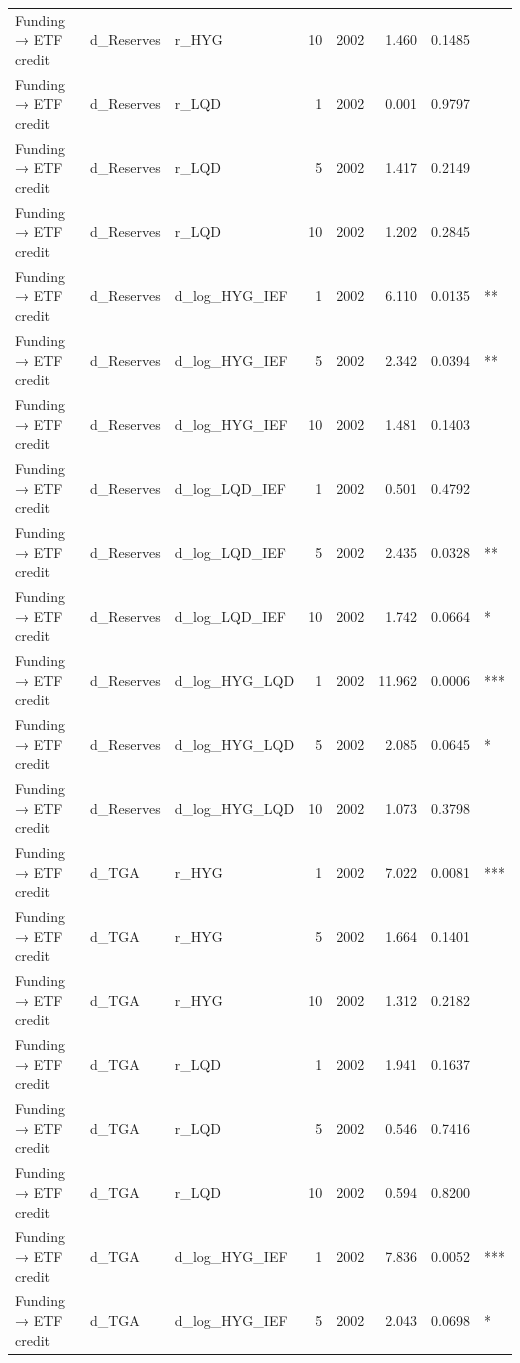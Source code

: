 \begin{table}[htbp]
\begin{tabular}{lllrrrrl}
  Funding → ETF credit & d\_Reserves & r\_HYG & 10 & 2002 & 1.460 & 0.1485 &     \\ 
  Funding → ETF credit & d\_Reserves & r\_LQD & 1 & 2002 & 0.001 & 0.9797 &     \\ 
  Funding → ETF credit & d\_Reserves & r\_LQD & 5 & 2002 & 1.417 & 0.2149 &     \\ 
  Funding → ETF credit & d\_Reserves & r\_LQD & 10 & 2002 & 1.202 & 0.2845 &     \\ 
  Funding → ETF credit & d\_Reserves & d\_log\_HYG\_IEF & 1 & 2002 & 6.110 & 0.0135 &  ** \\ 
  Funding → ETF credit & d\_Reserves & d\_log\_HYG\_IEF & 5 & 2002 & 2.342 & 0.0394 &  ** \\ 
  Funding → ETF credit & d\_Reserves & d\_log\_HYG\_IEF & 10 & 2002 & 1.481 & 0.1403 &     \\ 
  Funding → ETF credit & d\_Reserves & d\_log\_LQD\_IEF & 1 & 2002 & 0.501 & 0.4792 &     \\ 
  Funding → ETF credit & d\_Reserves & d\_log\_LQD\_IEF & 5 & 2002 & 2.435 & 0.0328 &  ** \\ 
  Funding → ETF credit & d\_Reserves & d\_log\_LQD\_IEF & 10 & 2002 & 1.742 & 0.0664 &   * \\ 
  Funding → ETF credit & d\_Reserves & d\_log\_HYG\_LQD & 1 & 2002 & 11.962 & 0.0006 & *** \\ 
  Funding → ETF credit & d\_Reserves & d\_log\_HYG\_LQD & 5 & 2002 & 2.085 & 0.0645 &   * \\ 
  Funding → ETF credit & d\_Reserves & d\_log\_HYG\_LQD & 10 & 2002 & 1.073 & 0.3798 &     \\ 
  Funding → ETF credit & d\_TGA & r\_HYG & 1 & 2002 & 7.022 & 0.0081 & *** \\ 
  Funding → ETF credit & d\_TGA & r\_HYG & 5 & 2002 & 1.664 & 0.1401 &     \\ 
  Funding → ETF credit & d\_TGA & r\_HYG & 10 & 2002 & 1.312 & 0.2182 &     \\ 
  Funding → ETF credit & d\_TGA & r\_LQD & 1 & 2002 & 1.941 & 0.1637 &     \\ 
  Funding → ETF credit & d\_TGA & r\_LQD & 5 & 2002 & 0.546 & 0.7416 &     \\ 
  Funding → ETF credit & d\_TGA & r\_LQD & 10 & 2002 & 0.594 & 0.8200 &     \\ 
  Funding → ETF credit & d\_TGA & d\_log\_HYG\_IEF & 1 & 2002 & 7.836 & 0.0052 & *** \\ 
  Funding → ETF credit & d\_TGA & d\_log\_HYG\_IEF & 5 & 2002 & 2.043 & 0.0698 &   * \\ 

\end{tabular}
\end{table}
